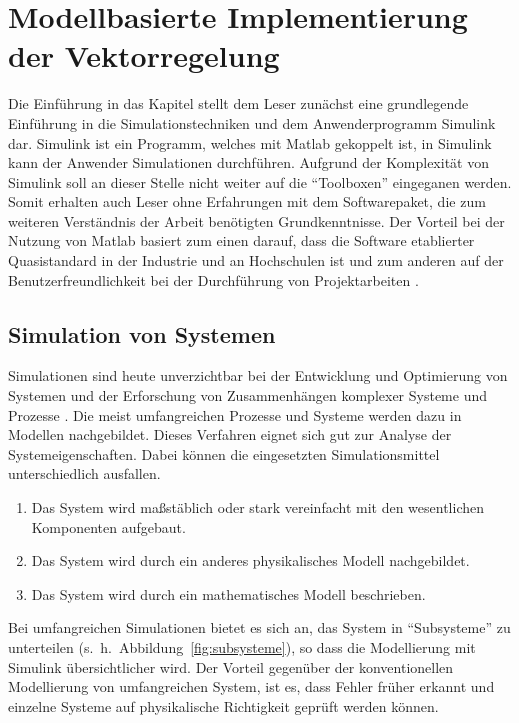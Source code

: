 
\chapter{Modellbasierte Implementierung der Vektorregelung}
\label{cha:regelungpmsm}

Die Einführung in das Kapitel stellt dem Leser zunächst eine grundlegende Einführung in die Simulationstechniken und dem Anwenderprogramm Simulink dar.
Simulink ist ein Programm, welches mit Matlab gekoppelt ist, in Simulink kann der Anwender Simulationen durchführen.
Aufgrund der Komplexität von Simulink soll an dieser Stelle nicht weiter auf die \enquote{Toolboxen} eingeganen werden.
Somit erhalten auch Leser ohne Erfahrungen mit dem Softwarepaket, die zum weiteren Verständnis der Arbeit benötigten Grundkenntnisse.
Der Vorteil bei der Nutzung von Matlab basiert zum einen darauf, dass die Software etablierter Quasistandard in der Industrie und an Hochschulen ist und zum anderen auf der Benutzerfreundlichkeit bei der Durchführung von Projektarbeiten \autocite{scherf2010}.

\section{Simulation von Systemen}\label{sec:simulation}

Simulationen sind heute unverzichtbar bei der Entwicklung und Optimierung von Systemen und der Erforschung von Zusammenhängen komplexer Systeme und Prozesse \autocite{brychta}.
Die meist umfangreichen Prozesse und Systeme werden dazu in Modellen nachgebildet.
Dieses Verfahren eignet sich gut zur Analyse der Systemeigenschaften.
Dabei können die eingesetzten Simulationsmittel unterschiedlich ausfallen.

\begin{enumerate}
	\item Das System wird maßstäblich oder stark vereinfacht mit den wesentlichen Komponenten aufgebaut.
	\item Das System wird durch ein anderes physikalisches Modell nachgebildet.
	\item Das System wird durch ein mathematisches Modell beschrieben.
\end{enumerate}

Bei umfangreichen Simulationen bietet es sich an, das System in \enquote{Subsysteme} zu unterteilen (s.~h.~Abbildung~\ref{fig:subsysteme}), so dass die Modellierung mit Simulink übersichtlicher wird.
Der Vorteil gegenüber der konventionellen Modellierung von umfangreichen System, ist es, dass Fehler früher erkannt und einzelne Systeme auf physikalische Richtigkeit geprüft werden können.

